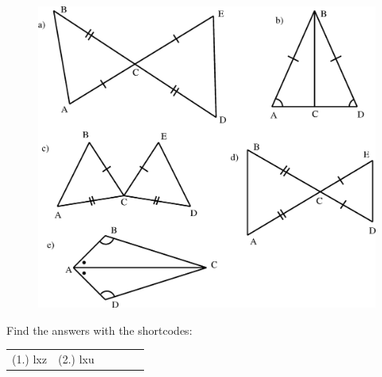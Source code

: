 \begin{enumerate}[noitemsep, label=\textbf{\arabic*}. ]
	\begin{figure}[H] %
    \begin{center}
    \label{m39368*id318571!!!underscore!!!media}\label{m39368*id318571!!!underscore!!!printimage}\includegraphics{col11306.imgs/m39368_MG10C13_039.png} %
        
      \vspace{2pt}
    \vspace{.1in}
    
    \end{center}

 \end{figure}   

    \addtocounter{footnote}{-0}
            \end{enumerate}
        
          

        
  
      
      \label{m39368*eip-75}
\par {} Find the answers with the shortcodes:
 \par \begin{tabular}[h]{cccccc}
 (1.) lxz  &  (2.) lxu  & \end{tabular}



